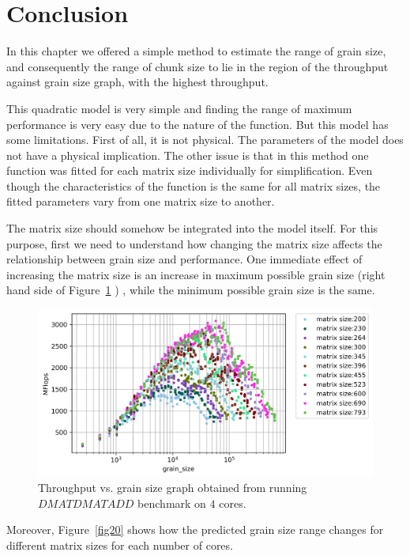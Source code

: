 \section{Conclusion}
In this chapter we offered a simple method to estimate the range of grain size, and consequently the range of chunk size to lie in the region of the throughput against grain size graph, with the highest throughput.

This quadratic model is very simple and finding the range of maximum performance is very easy due to the nature of the function. But this model has some limitations.
First of all, it is not physical. The parameters of the model does not have a physical implication.
The other issue is that in this method one function was fitted for each matrix size individually for simplification. Even though the characteristics of the function is the same for all matrix sizes, the fitted parameters vary from one matrix size to another. 

The matrix size should somehow be integrated into the model itself. For this purpose, first we need to understand how changing the matrix size affects the relationship between grain size and performance. 
One immediate effect of increasing the matrix size is an increase in maximum possible grain size (right hand side of Figure~\ref{fig19} ) , while the minimum possible grain size is the same.

\vspace{\baselineskip}	
\begin{figure}[H]	
	\centering\includegraphics[scale=.75]{images/fig11.png}			
	\caption{Throughput vs. grain size graph obtained from running $DMATDMATADD$ benchmark on $4$ cores.}
	\label{fig19}	
\end{figure} 

Moreover, Figure~\ref{fig20} shows how the predicted grain size range changes for different matrix sizes for each number of cores.

